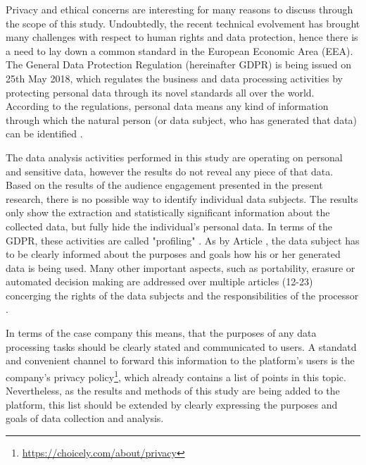 Privacy and ethical concerns are interesting for many reasons to discuss through the scope of this study. Undoubtedly, the recent technical evolvement has brought many challenges with respect to human rights and data protection, hence there is a need to lay down a common standard in the European Economic Area (EEA). The General Data Protection Regulation (hereinafter GDPR) \cite{gdpr} is being issued on 25th May 2018, which regulates the business and data processing activities by protecting personal data through its novel standards all over the world. According to the regulations, personal data means any kind of information through which the natural person (or data subject, who has generated that data) can be identified \cite{gdpr}. 

The data analysis activities performed in this study are operating on personal and sensitive data, however the results do not reveal any piece of that data. Based on the results of the audience engagement presented in the present research, there is no possible way to identify individual data subjects. The results only show the extraction and statistically significant information about the collected data, but fully hide the individual's personal data. In terms of the GDPR, these activities are called "profiling" \cite{gdpr}. As by Article \cite{gdpr}, the data subject has to be clearly informed about the purposes and goals how his or her generated data is being used. Many other important aspects, such as portability, erasure or automated decision making are addressed over multiple articles (12-23) concerging the rights of the data subjects and the responsibilities of the processor \cite{gdpr}.

In terms of the case company this means, that the purposes of any data processing tasks should be clearly stated and communicated to users. A standatd and convenient channel to forward this information to the platform's users is the company's privacy policy\footnote{\url{https://choicely.com/about/privacy}}, which already contains a list of points in this topic. Nevertheless, as the results and methods of this study are being added to the platform, this list should be extended by clearly expressing the purposes and goals of data collection and analysis.

